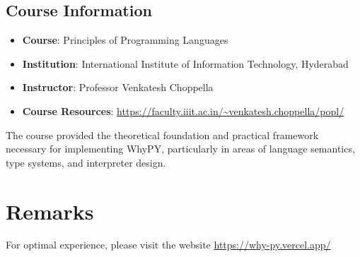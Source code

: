 \documentclass[conference]{IEEEtran}
\begin{document}
\subsection{Course Information}
\begin{itemize}
    \item \textbf{Course}: Principles of Programming Languages
    \item \textbf{Institution}: International Institute of Information Technology, Hyderabad
    \item \textbf{Instructor}: Professor Venkatesh Choppella
    \item \textbf{Course Resources}: \url{https://faculty.iiit.ac.in/~venkatesh.choppella/popl/}
\end{itemize}

The course provided the theoretical foundation and practical framework necessary for implementing WhyPY, particularly in areas of language semantics, type systems, and interpreter design.

\section{Remarks}
For optimal experience, please visit the website \url{https://why-py.vercel.app/}
\end{document}
